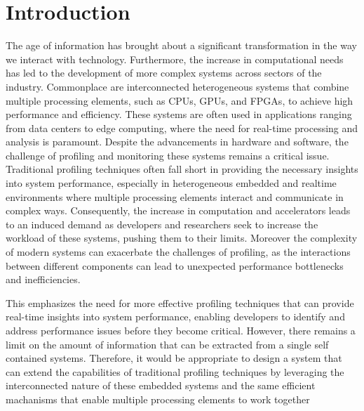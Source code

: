 \chapter{Introduction}
\label{chapter:introduction}

The age of information has brought about a significant transformation in the way we interact with technology. Furthermore, the increase in computational needs has led to the development of more complex systems across sectors of the industry. Commonplace are interconnected heterogeneous systems that combine multiple processing elements, such as CPUs, GPUs, and FPGAs, to achieve high performance and efficiency. These systems are often used in applications ranging from data centers to edge computing, where the need for real-time processing and analysis is paramount. Despite the advancements in hardware and software, the challenge of profiling and monitoring these systems remains a critical issue. Traditional profiling techniques often fall short in providing the necessary insights into system performance, especially in heterogeneous embedded and realtime environments where multiple processing elements interact and communicate in complex ways. Consequently, the increase in computation and accelerators leads to an induced demand as developers and researchers seek to increase the workload of these systems, pushing them to their limits. Moreover the complexity of modern systems can exacerbate the challenges of profiling, as the interactions between different components can lead to unexpected performance bottlenecks and inefficiencies.

This emphasizes the need for more effective profiling techniques that can provide real-time insights into system performance, enabling developers to identify and address performance issues before they become critical. However, there remains a limit on the amount of information that can be extracted from a single self contained systems. Therefore, it would be appropriate to design a system that can extend the capabilities of traditional profiling techniques by leveraging the interconnected nature of these embedded systems and the same efficient machanisms that enable multiple processing elements to work together




